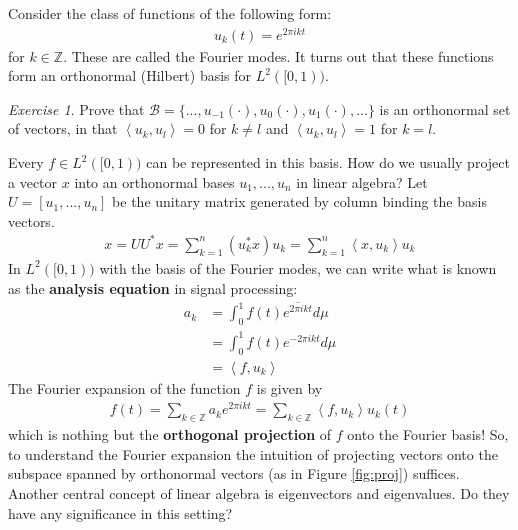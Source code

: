 \documentclass[11pt]{article}
\newcommand{\Z}{\ensuremath{\mathbb Z}}
\newcommand{\B}{\ensuremath{\mathcal B}}
\newcommand{\ip}[2]{\left\langle #1, #2\right\rangle}
\theoremstyle{plain}
\theoremstyle{definition}
\theoremstyle{remark}
\newtheorem{exc}{Exercise}[section]
\begin{document}
Consider the class of functions of the following form:
\begin{align*}
    u_k(t) = e^{2\pi i k t}
\end{align*}
for $k \in \Z$. These are called the Fourier modes. It turns out that these functions form an orthonormal (Hilbert) basis for $L^2([0,1))$.
\begin{exc}
    Prove that $\B = \{..., u_{-1}(\cdot), u_0(\cdot), u_1(\cdot), ...\}$ is an orthonormal set of vectors, in that $\ip{u_k}{u_l} = 0$ for $k \neq l$ and $\ip{u_k}{u_l} = 1$ for $k = l$.
\end{exc}
Every $f \in  L^2([0, 1))$ can be represented in this basis. How do we usually project a vector $x$ into an orthonormal bases $u_1, ..., u_n$ in linear algebra? Let $U = [u_1, ..., u_n]$ be the unitary matrix generated by column binding the basis vectors.
\begin{align*}
    x = UU^*x = \sum_{k=1}^n (u_k^*x) u_k = \sum_{k=1}^n \ip{x}{u_k} u_k
\end{align*}
In $L^2([0,1))$ with the basis of the Fourier modes, we can write what is known as the {\bf analysis equation} in signal processing:
\begin{align*}
    a_k &= \int_0^1 f(t) \overline{e^{2\pi i k t}} d\mu\\
    &= \int_0^1 f(t) e^{-2\pi i k t} d\mu\\
    &= \ip{f}{u_k}
\end{align*}
The Fourier expansion of the function $f$ is given by
\begin{align*}
    f(t) = \sum_{k \in \Z} a_k e^{2\pi i k t} = \sum_{k \in \Z} \ip{f}{u_k} u_k(t)
\end{align*}
which is nothing but the {\bf orthogonal projection} of $f$ onto the Fourier basis! So, to understand the Fourier expansion the intuition of projecting vectors onto the subspace spanned by orthonormal vectors (as in Figure \ref{fig:proj}) suffices. Another central concept of linear algebra is eigenvectors and eigenvalues. Do they have any significance in this setting?
\end{document}

